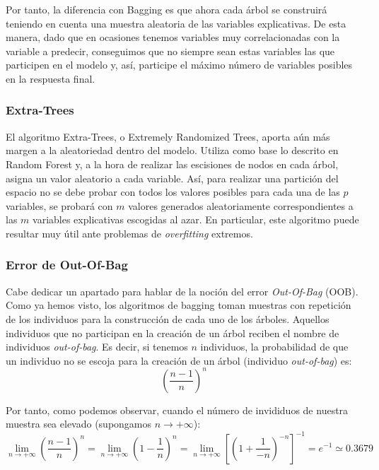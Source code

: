 \documentclass[12pt,twoside]{article}
\begin{document}
Por tanto, la diferencia con Bagging es que ahora cada árbol se construirá teniendo en cuenta una muestra aleatoria de las variables explicativas. De esta manera, dado que en ocasiones tenemos variables muy correlacionadas con la variable a predecir, conseguimos que no siempre sean estas variables las que participen en el modelo y, así, participe el máximo número de variables posibles en la respuesta final.


\subsubsection{Extra-Trees} \label{sec:ExtraTrees}
El algoritmo Extra-Trees, o Extremely Randomized Trees, aporta aún más margen a la aleatoriedad dentro del modelo. Utiliza como base lo descrito en Random Forest y, a la hora de realizar las escisiones de nodos en cada árbol, asigna un valor aleatorio a cada variable. Así, para realizar una partición del espacio no se debe probar con todos los valores posibles para cada una de las $p$ variables, se probará con $m$ valores generados aleatoriamente correspondientes a las $m$ variables explicativas escogidas al azar. En particular, este algoritmo puede resultar muy útil ante problemas de \textit{overfitting} extremos.


\subsubsection{Error de Out-Of-Bag}
Cabe dedicar un apartado para hablar de la noción del error \textit{Out-Of-Bag} (OOB). Como ya hemos visto, los algoritmos de bagging toman muestras con repetición de los individuos para la construcción de cada uno de los árboles. Aquellos individuos que no participan en la creación de un árbol reciben el nombre de individuos \textit{out-of-bag}. Es decir, si tenemos $n$ individuos, la probabilidad de que un individuo no se escoja para la creación de un árbol (individuo \textit{out-of-bag}) es:
\begin{equation*}
\left( \frac{n-1}{n} \right)^n
\end{equation*}

Por tanto, como podemos observar, cuando el número de invididuos de nuestra muestra sea elevado (supongamos $n \rightarrow +\infty$):
\begin{equation*}
\lim_{n \rightarrow + \infty} \left( \frac{n-1}{n} \right)^n = \lim_{n \rightarrow +\infty} \left( 1 - \frac{1}{n} \right)^n = \lim_{n \rightarrow +\infty} \left[ \left( 1 + \frac{1}{-n} \right)^{-n} \right] ^{-1} = e^{-1} \simeq 0.3679
\end{equation*}
\end{document}
